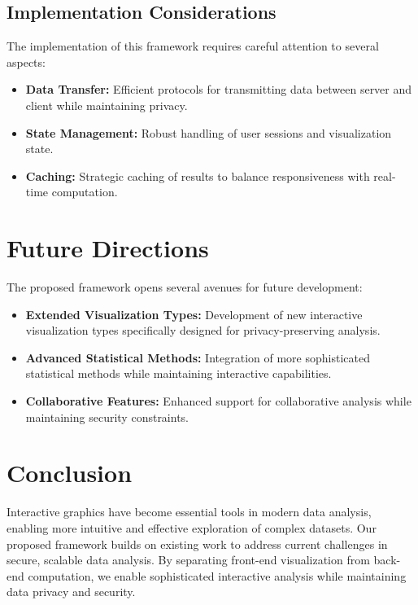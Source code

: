 \documentclass{article}
\begin{document}
\subsection{Implementation Considerations}
The implementation of this framework requires careful attention to several aspects:

\begin{itemize}
\item \textbf{Data Transfer:} Efficient protocols for transmitting data between server and client while maintaining privacy.

\item \textbf{State Management:} Robust handling of user sessions and visualization state.

\item \textbf{Caching:} Strategic caching of results to balance responsiveness with real-time computation.
\end{itemize}


\section{Future Directions}
\label{sec:future}

The proposed framework opens several avenues for future development:

\begin{itemize}
\item \textbf{Extended Visualization Types:} Development of new interactive visualization types specifically designed for privacy-preserving analysis.

\item \textbf{Advanced Statistical Methods:} Integration of more sophisticated statistical methods while maintaining interactive capabilities.

\item \textbf{Collaborative Features:} Enhanced support for collaborative analysis while maintaining security constraints.
\end{itemize}

\section{Conclusion}
\label{sec:conclusion}

Interactive graphics have become essential tools in modern data analysis, enabling more intuitive and effective exploration of complex datasets. Our proposed framework builds on existing work to address current challenges in secure, scalable data analysis. By separating front-end visualization from back-end computation, we enable sophisticated interactive analysis while maintaining data privacy and security.
\end{document}
